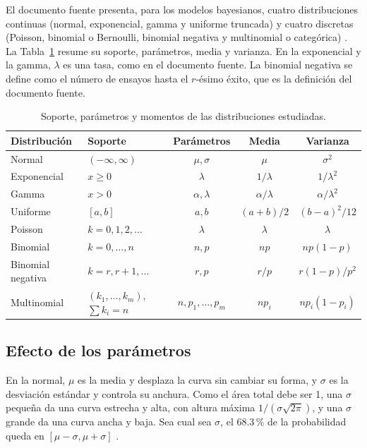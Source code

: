 \documentclass[11pt,letterpaper]{article}
\begin{document}
El documento fuente presenta, para los modelos bayesianos, cuatro distribuciones continuas (normal, exponencial, gamma y uniforme truncada) y cuatro discretas (Poisson, binomial o Bernoulli, binomial negativa y multinomial o categórica) \parencite{tecnm2026_documento_fuente}. La Tabla~\ref{tab:momentos} resume su soporte, parámetros, media y varianza. En la exponencial y la gamma, $\lambda$ es una tasa, como en el documento fuente. La binomial negativa se define como el número de ensayos hasta el $r$-ésimo éxito, que es la definición del documento fuente.

\begin{table}[htbp]
\centering
\caption{Soporte, parámetros y momentos de las distribuciones estudiadas.}
\label{tab:momentos}
\small
\renewcommand{\arraystretch}{1.5}
\begin{tabular}{llccc}
\hline
\textbf{Distribución} & \textbf{Soporte} & \textbf{Parámetros} & \textbf{Media} & \textbf{Varianza} \\
\hline
Normal & $(-\infty, \infty)$ & $\mu, \sigma$ & $\mu$ & $\sigma^2$ \\
Exponencial & $x \ge 0$ & $\lambda$ & $1/\lambda$ & $1/\lambda^2$ \\
Gamma & $x > 0$ & $\alpha, \lambda$ & $\alpha/\lambda$ & $\alpha/\lambda^2$ \\
Uniforme & $[a, b]$ & $a, b$ & $(a+b)/2$ & $(b-a)^2/12$ \\
\hline
Poisson & $k = 0, 1, 2, \dots$ & $\lambda$ & $\lambda$ & $\lambda$ \\
Binomial & $k = 0, \dots, n$ & $n, p$ & $np$ & $np(1-p)$ \\
Binomial negativa & $k = r, r+1, \dots$ & $r, p$ & $r/p$ & $r(1-p)/p^2$ \\
Multinomial & $(k_1, \dots, k_m)$, $\sum k_i = n$ & $n, p_1, \dots, p_m$ & $np_i$ & $np_i(1-p_i)$ \\
\hline
\end{tabular}
\end{table}

\subsection{Efecto de los parámetros}

En la normal, $\mu$ es la media y desplaza la curva sin cambiar su forma, y $\sigma$ es la desviación estándar y controla su anchura. Como el área total debe ser 1, una $\sigma$ pequeña da una curva estrecha y alta, con altura máxima $1/(\sigma\sqrt{2\pi})$, y una $\sigma$ grande da una curva ancha y baja. Sea cual sea $\sigma$, el 68.3\,\% de la probabilidad queda en $[\mu - \sigma, \mu + \sigma]$ \parencite{tecnm2026_documento_fuente}.
\end{document}
